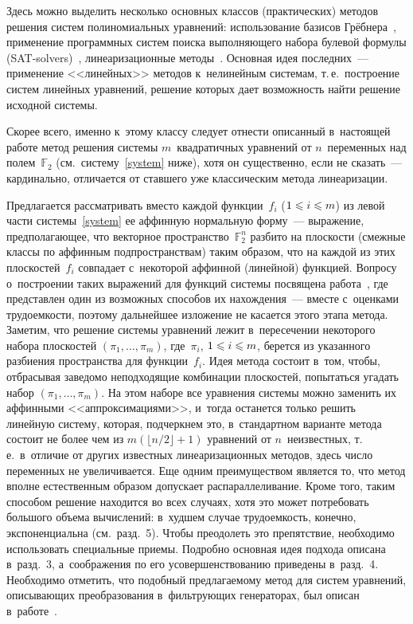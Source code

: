 \begin{multicols}{2}
Здесь можно выделить несколько основных классов (практических) методов решения 
систем полиномиальных уравнений:
использование базисов Грёбнера~\cite[разд.~12.2]{Bard2009}, применение 
про\-граммных систем поиска выполняющего набора булевой формулы 
(SAT-solvers)~\cite{BCJ2007}, линеаризационные 
методы~\cite[разд.~12.3]{Bard2009}.
Основная идея последних~--- применение <<линейных>> методов к~нелинейным 
сис\-те\-мам, т.\,е.\ построение сис\-тем линейных уравнений, решение которых дает 
воз\-мож\-ность найти решение исходной сис\-темы.

Скорее всего, именно к~этому классу следует отнести описанный в~настоящей работе 
метод решения системы $m$~квадратичных уравнений от $n$~переменных над 
полем~$\mathbb{F}_2$ (см.\ систему~\eqref{system} ниже), хотя он существенно, если не 
сказать~--- кардинально, отличается от ставшего уже классическим метода 
линеаризации.

Предлагается рассматривать вместо каждой функции~$f_i$ ($1\hm\leqslant i\hm\leqslant m$) из 
левой части системы~\eqref{system} ее аффинную нормальную форму~--- выражение, 
предполагающее, что векторное пространство~$\mathbb{F}_2^n$ разбито на плоскости 
(смежные классы по аффинным подпространствам) таким образом, что на каждой из 
этих плоскостей~$f_i$ совпадает с~некоторой аффинной (линейной) функцией.
Вопросу о~построении таких выражений для функций сис\-те\-мы посвящена 
работа~\cite{LSF2019}, где представлен один из возможных способов их нахождения~--- 
вместе с~оценками трудоемкости, поэтому дальнейшее изложение не касается 
этого этапа метода.
Заметим, что решение сис\-те\-мы уравнений лежит в~пересечении некоторого набора 
плоскостей $(\pi_1,\ldots,\pi_m)$, где~$\pi_i$, $1\hm\leqslant i\hm\leqslant m$, берется из 
указанного разбиения пространства для функции~$f_i$.
Идея метода со\-сто\-ит в~том, чтобы, отбрасывая заведомо неподходящие комбинации 
плоскостей, попытаться угадать набор $(\pi_1,\ldots,\pi_m)$.
На этом наборе все уравнения сис\-те\-мы можно заменить их аффинными 
<<аппроксимациями>>, и~тогда останется только решить линейную сис\-те\-му, которая, 
подчеркнем это, в~стандартном варианте метода со\-сто\-ит не более чем из 
$m(\lfloor{n}/{2}\rfloor+1)$ уравнений от $n$~неизвестных, т.\,е.\ 
в~отличие от других известных линеаризационных методов, здесь число переменных не 
увеличивается.
Еще одним преимуществом является то, что метод вполне естественным образом 
допускает распараллеливание.
Кроме того, таким способом решение находится во всех случаях, хотя это может 
потребовать большого объема вычислений: в~худшем случае трудоемкость, конечно, 
экспоненциальна (см.\ разд.~5). Чтобы преодолеть это препятствие, 
необходимо использовать специальные приемы.
Подробно основная идея подхода описана в~разд.~3, а~соображения по 
его усовершенствованию приведены в~разд.~4.
Необходимо отметить, что подобный пред\-ла\-га\-емо\-му метод для систем уравнений, 
описывающих преобразования в~фильтрующих генераторах, был описан 
в~работе~\cite{Log2008}.


\end{multicols}
